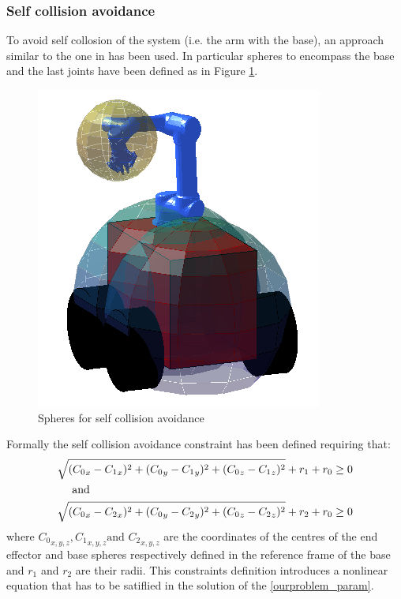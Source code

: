 \subsubsection*{Self collision avoidance}
	To avoid self collosion of the system (i.e. the arm with the base), an approach similar to the one in \cite{sandberg1988collision} has been used. In particular spheres to encompass the base and the last joints have been defined as in Figure \ref{spheres_3d}.
	\begin{figure}[h!]
	\centering
	\includegraphics[scale=0.4]{IMMAGINI/spheres_3d.png}
	\caption{Spheres for self collision avoidance}
	\label{spheres_3d}	
	\end{figure}
	Formally the self collision avoidance constraint has been defined requiring that: 
	\begin{equation}
	\begin{split} 
		&\sqrt{({C_0}_x-{C_1}_x)^2+({C_0}_y-{C_1}_y)^2+({C_0}_z-{C_1}_z)^2} + r_1 +r_0 \geq 0 \\
		&\ \ \ \ \textnormal{and} \\
		&\sqrt{({C_0}_x-{C_2}_x)^2+({C_0}_y-{C_2}_y)^2+({C_0}_z-{C_2}_z)^2} + r_2 +r_0 \geq 0 \\
	\end{split}
	\label{spheres_const}
	\end{equation}
	where ${C_0}_{x,y,z},{C_1}_{x,y,z} \text{and }{C_2}_{x,y,z}$ are the coordinates of the centres of the end effector and base spheres respectively defined in the reference frame of the base and $r_1$ and $r_2$ are their radii. This constraints definition introduces a nonlinear equation that has to be satiflied in the solution of the \ref{ourproblem_param}. \\


